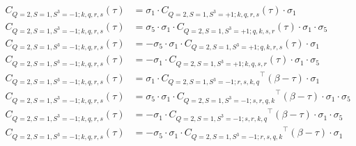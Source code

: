 \begin{equation}
  \begin{aligned}
    C_{Q=2,S=1,S^3=-1;k,q,r,s} (\tau) &= \sigma_1\cdot{C_{Q=2,S=1,S^3=+1;k,q,r,s}} (\tau) \cdot\sigma_1
    \\
    C_{Q=2,S=1,S^3=-1;k,q,r,s} (\tau) &= \sigma_5\cdot \sigma_1\cdot{C_{Q=2,S=1,S^3=+1;q,k,s,r}} (\tau) \cdot\sigma_1\cdot\sigma_5
    \\
    C_{Q=2,S=1,S^3=-1;k,q,r,s} (\tau) &= - \sigma_5\cdot \sigma_1\cdot{C_{Q=2,S=1,S^3=+1;q,k,r,s}} (\tau) \cdot\sigma_1
    \\
    C_{Q=2,S=1,S^3=-1;k,q,r,s} (\tau) &= - \sigma_1\cdot{C_{Q=2,S=1,S^3=+1;k,q,s,r}} (\tau) \cdot\sigma_1\cdot\sigma_5
    \\
    C_{Q=2,S=1,S^3=-1;k,q,r,s} (\tau) &= \sigma_1\cdot{C_{Q=2,S=1,S^3=-1;r,s,k,q}}^\top (\beta-\tau) \cdot\sigma_1 
    \\
    C_{Q=2,S=1,S^3=-1;k,q,r,s} (\tau) &= \sigma_5\cdot \sigma_1\cdot{C_{Q=2,S=1,S^3=-1;s,r,q,k}}^\top (\beta-\tau) \cdot\sigma_1\cdot\sigma_5
    \\
    C_{Q=2,S=1,S^3=-1;k,q,r,s} (\tau) &= - \sigma_1\cdot{C_{Q=2,S=1,S^3=-1;s,r,k,q}}^\top (\beta-\tau) \cdot\sigma_1\cdot\sigma_5 
    \\
    C_{Q=2,S=1,S^3=-1;k,q,r,s} (\tau) &= - \sigma_5\cdot \sigma_1\cdot{C_{Q=2,S=1,S^3=-1;r,s,q,k}}^\top (\beta-\tau) \cdot\sigma_1
    \\
  \end{aligned}
\end{equation}

